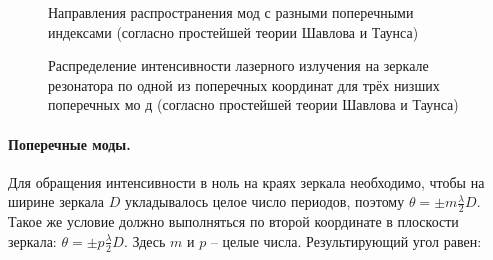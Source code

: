\documentclass[a4paper,12pt]{article}
\theoremstyle{definition}
\begin{document}
\begin{figure}[H]
	\begin{minipage}[h]{0.49\linewidth}
		\caption{Направления распространения мод с разными поперечными индексами (согласно простейшей теории Шавлова и Таунса)}
	\end{minipage}
	\begin{minipage}[h]{0.49\linewidth}
		\caption{Распределение интенсивности лазерного излучения на
		зеркале резонатора по одной из
		поперечных координат для трёх
		низших поперечных мо
		д (согласно простейшей теории Шавлова
		и Таунса)}
	\end{minipage}
\end{figure}

\paragraph{Поперечные моды.} Для обращения интенсивности в ноль на краях зеркала необходимо, 
чтобы на ширине зеркала $D$ укладывалось целое число периодов, поэтому $\theta = \pm m \frac{\lambda}{2} D$.
Такое же условие должно выполняться по второй координате в плоскости зеркала:
$\theta = \pm p \frac{\lambda}{2} D$. Здесь $m$ и $p$ -- целые числа. Результирующий угол равен:
\end{document}
